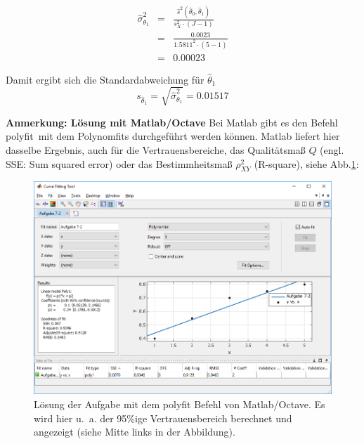 \begin{eqnarray}
\hat\sigma^2_{\theta_1} &=& \frac{ \hat s^2(\hat{\theta}_0 ,\hat{\theta}_1 )}
{s^2_X \cdot (J- 1) }
\nonumber \\
&=& \frac{ 0.0023}
{1.5811^2 \cdot (5- 1) } \nonumber \\
&=& 0.00023
\end{eqnarray}

Damit ergibt sich die Standardabweichung für $\hat\theta_1$
\[
s_{\hat\theta_1} = \sqrt{\hat\sigma_{\theta_1}^2} = 0.01517
\]

\newpage
\textbf{Anmerkung: Lösung mit Matlab/Octave} 
Bei Matlab gibt es den Befehl \glqq polyfit\grqq ~mit dem Polynomfits durchgeführt werden können. Matlab liefert hier dasselbe Ergebnis, auch für die Vertrauensbereiche, das Qualitätsmaß $Q$ (engl. SSE: Sum squared error) oder das Bestimmheitsmaß $\rho^2_{XY}$ (R-square), siehe Abb.\ref{fig:MatlabPolyfit}:
\begin{figure}[!htp]
	\begin{center}
		\includegraphics[width=160mm]{02_vorlesung/media/Matlab_CFTool.png}
		\caption{Lösung der Aufgabe mit dem polyfit Befehl von Matlab/Octave. 
			Es wird hier u.~a. der 95\%ige Vertrauensbereich berechnet und
			angezeigt (siehe Mitte links in der Abbildung).}
		\label{fig:MatlabPolyfit}
	\end{center}
\end{figure}

